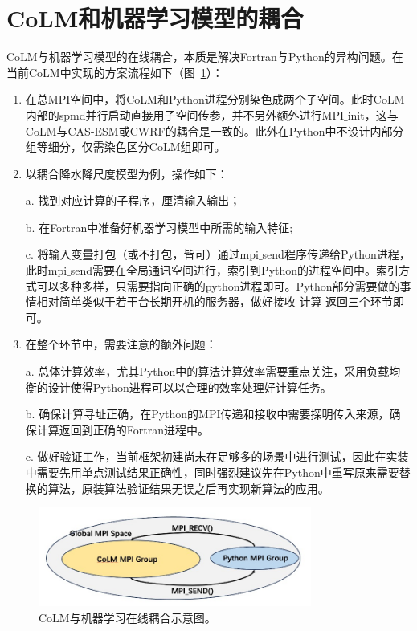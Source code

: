 \section{CoLM和机器学习模型的耦合}\label{CoLM和机器学习模型在线耦合}
CoLM与机器学习模型的在线耦合，本质是解决Fortran与Python的异构问题。在当前CoLM中实现的方案流程如下（图~\ref{fig:colmml耦合图}）：
\begin{enumerate}
    \item 在总MPI空间中，将CoLM和Python进程分别染色成两个子空间。此时CoLM内部的spmd并行启动直接用子空间传参，并不另外额外进行MPI$\_$init，这与CoLM与CAS-ESM或CWRF的耦合是一致的。此外在Python中不设计内部分组等细分，仅需染色区分CoLM组即可。
    \item 以耦合降水降尺度模型为例，操作如下：
    
    a. 找到对应计算的子程序，厘清输入输出；
    
    b. 在Fortran中准备好机器学习模型中所需的输入特征; 
    
    c. 将输入变量打包（或不打包，皆可）通过mpi$\_$send程序传递给Python进程，此时mpi$\_$send需要在全局通讯空间进行，索引到Python的进程空间中。索引方式可以多种多样，只需要指向正确的python进程即可。Python部分需要做的事情相对简单类似于若干台长期开机的服务器，做好接收-计算-返回三个环节即可。
    \item 在整个环节中，需要注意的额外问题：
    
    a. 总体计算效率，尤其Python中的算法计算效率需要重点关注，采用负载均衡的设计使得Python进程可以以合理的效率处理好计算任务。
    
    b. 确保计算寻址正确，在Python的MPI传递和接收中需要探明传入来源，确保计算返回到正确的Fortran进程中。
    
    c. 做好验证工作，当前框架初建尚未在足够多的场景中进行测试，因此在实装中需要先用单点测试结果正确性，同时强烈建议先在Python中重写原来需要替换的算法，原装算法验证结果无误之后再实现新算法的应用。
\end{enumerate}

{
\begin{figure}[htbp]
\centering
\includegraphics[width=0.8\textwidth]{Figures/尺度转换/colmml耦合图.jpg}
\caption{CoLM与机器学习在线耦合示意图。}
\label{fig:colmml耦合图}
\end{figure}
}
